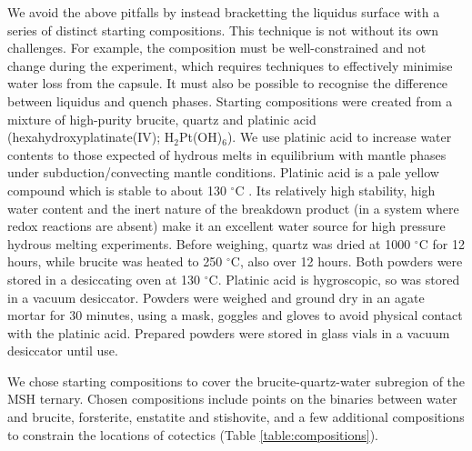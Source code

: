 \documentclass[review]{elsarticle}
\begin{document}
We avoid the above pitfalls by instead bracketting the liquidus surface with a series of distinct starting compositions. This technique is not without its own challenges. For example, the composition must be well-constrained and not change during the experiment, which requires techniques to effectively minimise water loss from the capsule. It must also be possible to recognise the difference between liquidus and quench phases. Starting compositions were created from a mixture of high-purity brucite, quartz and platinic acid (hexahydroxyplatinate(IV); H$_2$Pt(OH)$_6$). We use platinic acid to increase water contents to those expected of hydrous melts in equilibrium with mantle phases under subduction/convecting mantle conditions. Platinic acid is a pale yellow compound which is stable to about 130 $^{\circ}$C \citep{Nagano2002}. Its relatively high stability, high water content and the inert nature of the breakdown product (in a system where redox reactions are absent) make it an excellent water source for high pressure hydrous melting experiments. Before weighing, quartz was dried at 1000 $^{\circ}$C for 12 hours, while brucite was heated to 250 $^{\circ}$C, also over 12 hours. Both powders were stored in a desiccating oven at 130 $^{\circ}$C. Platinic acid is hygroscopic, so was stored in a vacuum desiccator. Powders were weighed and ground dry in an agate mortar for 30 minutes, using a mask, goggles and gloves to avoid physical contact with the platinic acid. Prepared powders were stored in glass vials in a vacuum desiccator until use.

We chose starting compositions to cover the brucite-quartz-water subregion of the MSH ternary. Chosen compositions include points on the binaries between water and brucite, forsterite, enstatite and stishovite, and a few additional compositions to constrain the locations of cotectics (Table \ref{table:compositions}).
\end{document}
